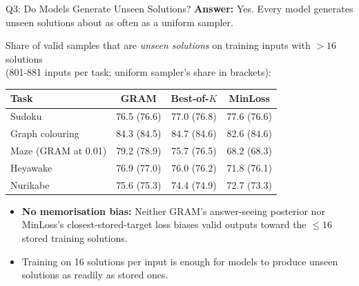 \documentclass[aspectratio=169,10pt]{beamer}
\newcommand{\Bok}{Best-of-$K$}
\begin{document}
\begin{frame}{Q3: Do Models Generate Unseen Solutions?}
  \textbf{Answer:} Yes. Every model generates unseen solutions about as often as a uniform sampler.

  \vspace{0.6em}
  \centering
  \small
  Share of valid samples that are \emph{unseen solutions} on training inputs with $>16$ solutions\\
  {\footnotesize (801-881 inputs per task; uniform sampler's share in brackets):}\\[0.5em]
  \begin{tabular}{@{}lccc@{}}
    \toprule
    \textbf{Task} & \textbf{GRAM} & \textbf{\Bok{}} & \textbf{MinLoss} \\
    \midrule
    Sudoku & 76.5 (76.6) & 77.0 (76.8) & 77.6 (76.6) \\
    Graph colouring & 84.3 (84.5) & 84.7 (84.6) & 82.6 (84.6) \\
    Maze (GRAM at 0.01) & 79.2 (78.9) & 75.7 (76.5) & 68.2 (68.3) \\
    Heyawake & 76.9 (77.0) & 76.0 (76.2) & 71.8 (76.1) \\
    Nurikabe & 75.6 (75.3) & 74.4 (74.9) & 72.7 (73.3) \\
    \bottomrule
  \end{tabular}

  \vspace{0.8em}
  \raggedright\normalsize
  \begin{itemize}\setlength{\itemsep}{0.4em}
    \item \textbf{No memorisation bias:} Neither GRAM's answer-seeing posterior nor MinLoss's closest-stored-target loss biases valid outputs toward the $\le 16$ stored training solutions.
    \item Training on 16 solutions per input is enough for models to produce unseen solutions as readily as stored ones.
  \end{itemize}
\end{frame}


\end{document}
